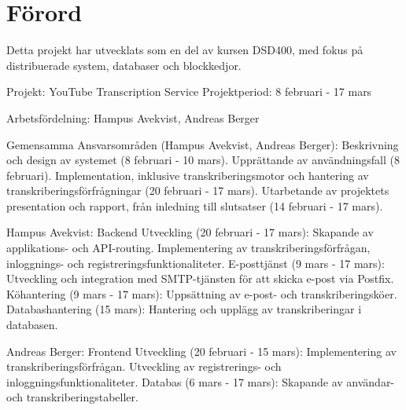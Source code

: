 \thispagestyle{plain}

\section{Förord}
Detta projekt har utvecklats som en del av kursen DSD400, med fokus på distribuerade system, databaser och blockkedjor.

Projekt: YouTube Transcription Service
Projektperiod: 8 februari - 17 mars

Arbetsfördelning:
Hampus Avekvist, Andreas Berger

Gemensamma Ansvarsområden (Hampus Avekvist, Andreas Berger):
Beskrivning och design av systemet (8 februari - 10 mars).
Upprättande av användningsfall (8 februari).
Implementation, inklusive transkriberingsmotor och hantering av transkriberingsförfrågningar (20 februari - 17 mars).
Utarbetande av projektets presentation och rapport, från inledning till slutsatser (14 februari - 17 mars).

Hampus Avekvist:
Backend Utveckling (20 februari - 17 mars):
Skapande av applikations- och API-routing.
Implementering av transkriberingsförfrågan, inloggnings- och registreringsfunktionaliteter.
E-posttjänst (9 mars - 17 mars):
Utveckling och integration med SMTP-tjänsten för att skicka e-post via Postfix.
Köhantering (9 mars - 17 mars):
Uppsättning av e-post- och transkriberingsköer.
Databashantering (15 mars):
Hantering och upplägg av transkriberingar i databasen.

Andreas Berger:
Frontend Utveckling (20 februari - 15 mars):
Implementering av transkriberingsförfrågan.
Utveckling av registrerings- och inloggningsfunktionaliteter.
Databas (6 mars - 17 mars):
Skapande av användar- och transkriberingstabeller.